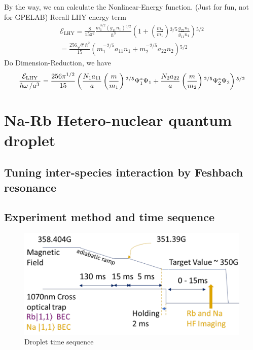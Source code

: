 By the way, we can calculate the Nonlinear-Energy function. (Just for fun, not for GPELAB)
Recall LHY energy term
\begin{equation}
\begin{split}
\mathcal{E}_{\text{LHY}}=\frac{8}{15\pi ^2}\frac{m_1^{3/2}\left(g_{11}n_1\right){}^{5/2}}{\hbar ^3}\left(1+\left(\frac{m_2}{m_1}\right){}^{3/5}\frac{g_{22}n_2}{g_{11}n_1}\right){}^{5/2}\\
=\frac{256\sqrt{\pi }\hbar ^2}{15}\left(m_1^{-2/5}a_{11}n_1+m_2^{-2/5}a_{22}n_2\right){}^{5/2}
\end{split}
\end{equation}
Do Dimension-Reduction, we have
\begin{equation}
\frac{\mathcal{E}_{\text{LHY}}}{\hbar\omega\left/a^3\right.}=\frac{256\pi^{1/2}}{15}\left(\frac{N_1a_{11}}{a}\left(\frac{m}{m_1}\right){}^{2/5}\Psi_1^*\Psi_1+\frac{N_2a_{22}}{a}\left(\frac{m}{m_2}\right){}^{2/5}\Psi _2^*\Psi _2\right){}^{5/2}
\end{equation}

\section{Na-Rb Hetero-nuclear quantum droplet}
\subsection{Tuning inter-species interaction by Feshbach resonance}
\subsection{Experiment method and time sequence}

\begin{figure}[hb]
\begin{center}
\includegraphics[width = 0.8\linewidth]{figures/Droplet_time-sequence.pdf}
\end{center}
\caption{Droplet time sequence}
\label{Droplet_time-sequence}
\end{figure}

